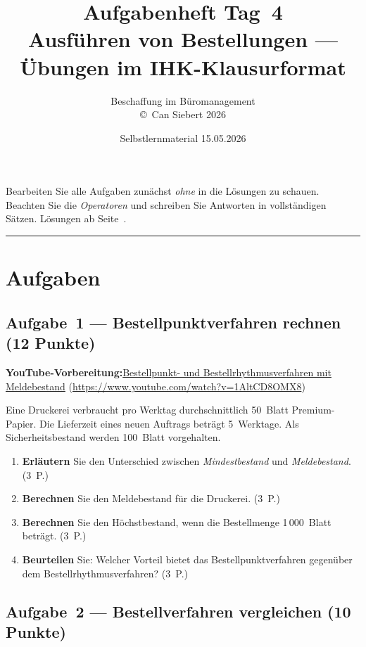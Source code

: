 \documentclass[11pt, a4paper]{article}
\title{\vspace*{-1.5cm}\Huge\bfseries\color{bfwPrimaryDark}Aufgabenheft Tag~4\\[0.4em]
  \large\color{bfwInkSoft}\textnormal{Ausführen von Bestellungen --- Übungen im IHK-Klausurformat}}
\author{\textsf{Beschaffung im Büromanagement}\\
\textsf{\small\copyright\ Can Siebert\,\textperiodcentered\,2026}}
\date{Selbstlernmaterial \textperiodcentered{} 15.05.2026}
\begin{document}
\maketitle
\thispagestyle{empty}

\begin{merksatz}[title={\bfseries So nutzen Sie dieses Aufgabenheft}]
Bearbeiten Sie alle Aufgaben zunächst \emph{ohne} in die Lösungen zu schauen.
Beachten Sie die \emph{Operatoren} und schreiben Sie Antworten in vollständigen Sätzen.
Lösungen ab Seite~\pageref{loesungen}.
\end{merksatz}

\tableofcontents
\vspace{1em}
\hrule

\section{Aufgaben}

\subsection*{Aufgabe~1 --- Bestellpunktverfahren rechnen (12 Punkte)}

\noindent\textbf{\color{bfwAccent}YouTube-Vorbereitung:}\enspace \href{https://www.youtube.com/watch?v=1AltCD8OMX8}{Bestellpunkt- und Bestellrhythmusverfahren mit Meldebestand} (\url{https://www.youtube.com/watch?v=1AltCD8OMX8})

\medskip
Eine Druckerei verbraucht pro Werktag durchschnittlich 50~Blatt Premium-Papier. Die
Lieferzeit eines neuen Auftrags beträgt 5~Werktage. Als Sicherheitsbestand werden
100~Blatt vorgehalten.

\begin{enumerate}[label=(\alph*)]
  \item \textbf{Erläutern} Sie den Unterschied zwischen \emph{Mindestbestand} und \emph{Meldebestand}. \hfill (3~P.)
  \item \textbf{Berechnen} Sie den Meldebestand für die Druckerei. \hfill (3~P.)
  \item \textbf{Berechnen} Sie den Höchstbestand, wenn die Bestellmenge 1\,000~Blatt beträgt. \hfill (3~P.)
  \item \textbf{Beurteilen} Sie: Welcher Vorteil bietet das Bestellpunktverfahren gegenüber dem Bestellrhythmus\-verfahren? \hfill (3~P.)
\end{enumerate}

\subsection*{Aufgabe~2 --- Bestellverfahren vergleichen (10 Punkte)}
\end{document}
